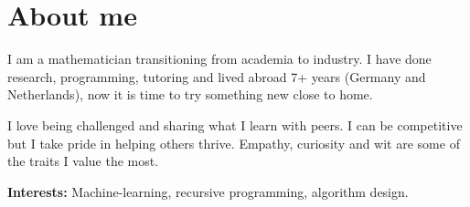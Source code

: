 \documentclass[a4paper,11pt]{twentysecondcv} %
\begin{document}


		


\makeprofile %


\color{black!80} \cvnamefont {}\selectfont
\linespread{1}
\vspace{-5pt}
\section{About me} 
	\begin{onehalfspace}
		I am a mathematician transitioning from academia to industry.\newline
		I have done research, programming, tutoring and lived abroad 7+ years (Germany and Netherlands), now it is time to try something new close to home.
		
		
		I love being challenged and sharing what I learn with peers.
		I can be competitive but I take pride in helping others thrive. Empathy, curiosity and wit are some of the traits I value the most.
		
		\textbf{Interests:} Machine-learning, recursive programming, algorithm design.
	\end{onehalfspace}
\end{document}

